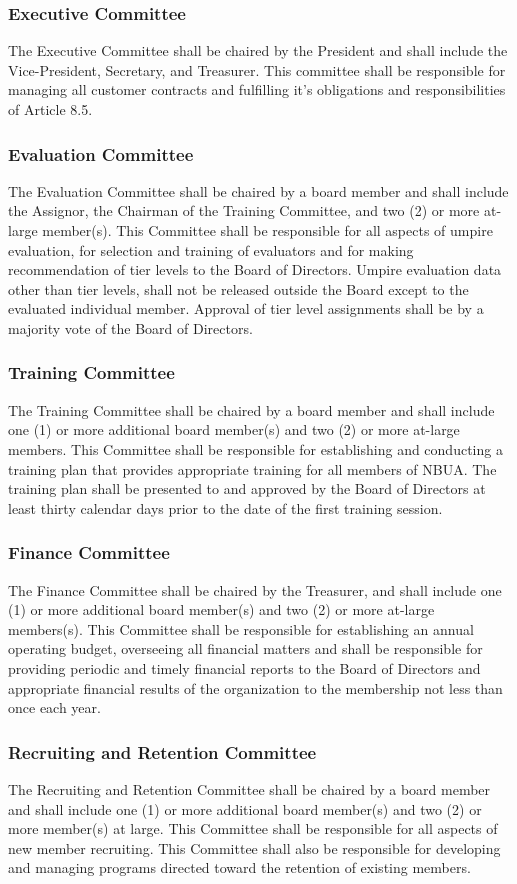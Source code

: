 \documentclass[letterpaper,11pt]{article}
\begin{document}
\subsubsection{Executive Committee}
The Executive Committee shall be chaired by the President and shall include the Vice-President, Secretary, and Treasurer. This committee shall be responsible for managing all customer contracts and fulfilling it's obligations and responsibilities of Article 8.5.
\subsubsection{Evaluation Committee}
The Evaluation Committee shall be chaired by a board member and shall include the Assignor, the Chairman of the Training Committee, and two (2) or more at-large member(s). This Committee shall be responsible for all aspects of umpire evaluation, for selection and training of evaluators and for making recommendation of tier levels to the Board of Directors. Umpire evaluation data other than tier levels, shall not be released outside the Board except to the evaluated individual member. Approval of tier level assignments shall be by a majority vote of the Board of Directors.
\subsubsection{Training Committee}
The Training Committee shall be chaired by a board member and shall include one (1) or more additional board member(s) and two (2) or more at-large members. This Committee shall be responsible for establishing and conducting a training plan that provides appropriate training for all members of NBUA. The training plan shall be presented to and approved by the Board of Directors at least thirty calendar days prior to the date of the first training session.
\subsubsection{Finance Committee}
The Finance Committee shall be chaired by the Treasurer, and shall include one (1) or more additional board member(s) and two (2) or more at-large members(s). This Committee shall be responsible for establishing an annual operating budget, overseeing all financial matters and shall be responsible for providing periodic and timely financial reports to the Board of Directors and appropriate financial results of the organization to the membership not less than once each year.
\subsubsection{Recruiting and Retention Committee}
The Recruiting and Retention Committee shall be chaired by a board member and shall include one (1) or more additional board member(s) and two (2) or more member(s) at large. This Committee shall be responsible for all aspects of new member recruiting. This Committee shall also be responsible for developing and managing programs directed toward the retention of existing members.
\end{document}
